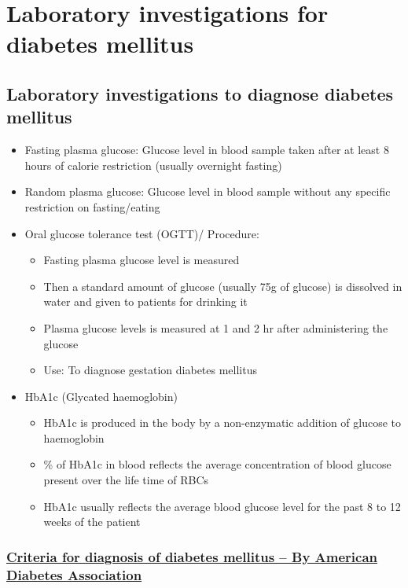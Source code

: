 \documentclass[
]{book}
\begin{document}
\section{Laboratory investigations for diabetes mellitus}\label{laboratory-investigations-for-diabetes-mellitus}

\subsection{Laboratory investigations to diagnose diabetes mellitus}\label{laboratory-investigations-to-diagnose-diabetes-mellitus}

\begin{itemize}
\item
  Fasting plasma glucose: Glucose level in blood sample taken after at least 8 hours of calorie restriction (usually overnight fasting)
\item
  Random plasma glucose: Glucose level in blood sample without any specific restriction on fasting/eating
\item
  Oral glucose tolerance test (OGTT)/
  Procedure:

  \begin{itemize}
  \item
    Fasting plasma glucose level is measured
  \item
    Then a standard amount of glucose (usually 75g of glucose) is dissolved in water and given to patients for drinking it
  \item
    Plasma glucose levels is measured at 1 and 2 hr after administering the glucose
  \item
    Use: To diagnose gestation diabetes mellitus
  \end{itemize}
\item
  HbA1c (Glycated haemoglobin)

  \begin{itemize}
  \item
    HbA1c is produced in the body by a non-enzymatic addition of glucose to haemoglobin
  \item
    \% of HbA1c in blood reflects the average concentration of blood glucose present over the life time of RBCs
  \item
    HbA1c usually reflects the average blood glucose level for the past 8 to 12 weeks of the patient
  \end{itemize}
\end{itemize}

\subsubsection{\texorpdfstring{\hyperref[https:ux2fux2fdiabetesjournals.orgux2fcareux2farticleux2f47ux2fSupplement_1ux2fS20ux2f153954ux2f2-Diagnosis-and-Classification-of-Diabetes]{Criteria for diagnosis of diabetes mellitus -- By American Diabetes Association}}{Criteria for diagnosis of diabetes mellitus -- By American Diabetes Association}}\label{criteria-for-diagnosis-of-diabetes-mellitus-by-american-diabetes-association}
\end{document}
